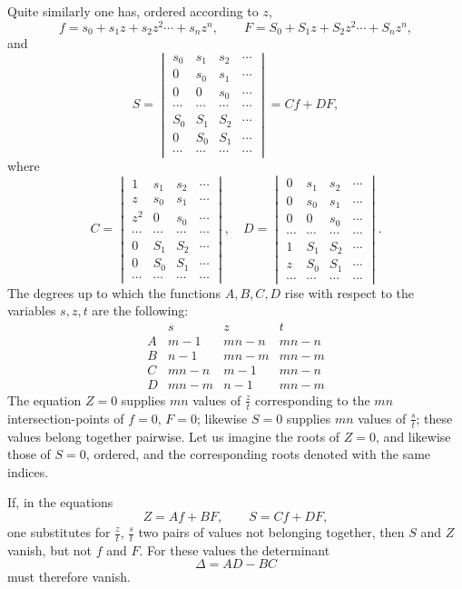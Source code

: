 \documentclass[10pt]{article}
\begin{document}
Quite similarly one has, ordered according to $z$,
\[
f=s_0+s_1z+s_2z^2\cdots+s_nz^n,
\qquad
F=S_0+S_1z+S_2z^2\cdots+S_nz^n,
\]
and
\[
S=\begin{vmatrix}
s_0&s_1&s_2&\cdots\\
0&s_0&s_1&\cdots\\
0&0&s_0&\cdots\\
\cdots&\cdots&\cdots&\cdots\\
S_0&S_1&S_2&\cdots\\
0&S_0&S_1&\cdots\\
\cdots&\cdots&\cdots&\cdots
\end{vmatrix}=Cf+DF,
\]
where
\[
C=\begin{vmatrix}
1&s_1&s_2&\cdots\\
z&s_0&s_1&\cdots\\
z^2&0&s_0&\cdots\\
\cdots&\cdots&\cdots&\cdots\\
0&S_1&S_2&\cdots\\
0&S_0&S_1&\cdots\\
\cdots&\cdots&\cdots&\cdots
\end{vmatrix},\quad
D=\begin{vmatrix}
0&s_1&s_2&\cdots\\
0&s_0&s_1&\cdots\\
0&0&s_0&\cdots\\
\cdots&\cdots&\cdots&\cdots\\
1&S_1&S_2&\cdots\\
z&S_0&S_1&\cdots\\
\cdots&\cdots&\cdots&\cdots
\end{vmatrix}.
\]
The degrees up to which the functions $A,B,C,D$ rise with respect to the variables $s,z,t$ are the following:
\[
\begin{array}{c|ccc}
& s&z&t\\ \hline
A&m-1&mn-n&mn-n\\
B&n-1&mn-m&mn-m\\
C&mn-n&m-1&mn-n\\
D&mn-m&n-1&mn-m
\end{array}
\]
The equation $Z=0$ supplies $mn$ values of $\frac{z}{t}$ corresponding to the $mn$ intersection-points of $f=0$, $F=0$; likewise $S=0$ supplies $mn$ values of $\frac{s}{t}$; these values belong together pairwise. Let us imagine the roots of $Z=0$, and likewise those of $S=0$, ordered, and the corresponding roots denoted with the same indices.

If, in the equations
\[
Z=Af+BF,
\qquad
S=Cf+DF,
\]
one substitutes for $\frac{z}{t}$, $\frac{s}{t}$ two pairs of values not belonging together, then $S$ and $Z$ vanish, but not $f$ and $F$. For these values the determinant
\[
\Delta=AD-BC
\]
must therefore vanish.
\end{document}
